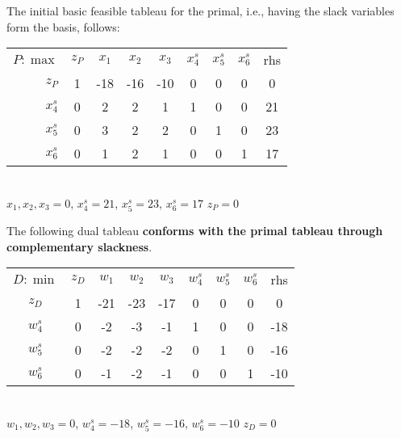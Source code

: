 \begin{solution}
The initial basic feasible tableau for the primal, i.e., having the slack variables form the basis, follows:

\begin{center} \begin{tabular} {r|c|c|c|c|c|c|c|c|} \cline{2-9} 
$P:\max$ & $z_P$ & $x_1$ & $x_2$ & $x_3$ & $x^s_4$ & $x^s_5$ & $x^s_6$ & rhs  \\ \cline{2-9}\cline{2-9} 
$z_P$	& 1  	& -18   & -16   & -10   & 0    	  & 0      	& 0       & 0   \\ \cline{2-9}  
$x^s_4$	& 0  	& 2     & 2     & 1     & 1    	  & 0      	& 0       & 21   \\ \cline{2-9} 
$x^s_5$	& 0  	& 3     & 2     & 2     & 0    	  & 1      	& 0       & 23   \\ \cline{2-9} 
$x^s_6$	& 0  	& 1     & 2     & 1     & 0    	  & 0      	& 1       & 17   \\ \cline{2-9}
\end{tabular} \\ \vspace{3mm} 
{$x_1, x_2, x_3=0$, $x^s_4=21$, $x^s_5=23$, $x^s_6=17$  $z_P=0$} \\ \end{center}
\vspace{4mm} The following dual tableau {\bf conforms with the primal tableau through complementary slackness}.\\
\begin{center} \begin{tabular} {c|c|c|c|c|c|c|c|c|} \cline{2-9} 
$D:\min$	& $z_D$ & $w_1$ & $w_2$ & $w_3$ & $w^s_4$ & $w^s_5$ & $w^s_6$ & rhs \\ \cline{2-9}\cline{2-9}  
$z_D$	& 1     & -21   & -23   & -17     	& 0    	& 0    	& 0     	& 0   	\\ \cline{2-9}  
$w^s_4$	& 0    	& -2    & -3    & -1     	& 1  		& 0  		& 0     	& -18   \\ \cline{2-9}   
$w^s_5$ & 0    	& -2    & -2    & -2     	& 0  		& 1   		& 0     	& -16   \\ \cline{2-9}   
$w^s_6$	& 0    	& -1    & -2    & -1   	& 0   		& 0  		& 1     	& -10    \\ \cline{2-9} 
\end{tabular} \\ \vspace{3mm} 
{$w_1, w_2, w_3=0$, $w^s_4=-18$, $w^s_5=-16$, $w^s_6=-10$  $z_D=0$} \\ \end{center}


\end{solution}

